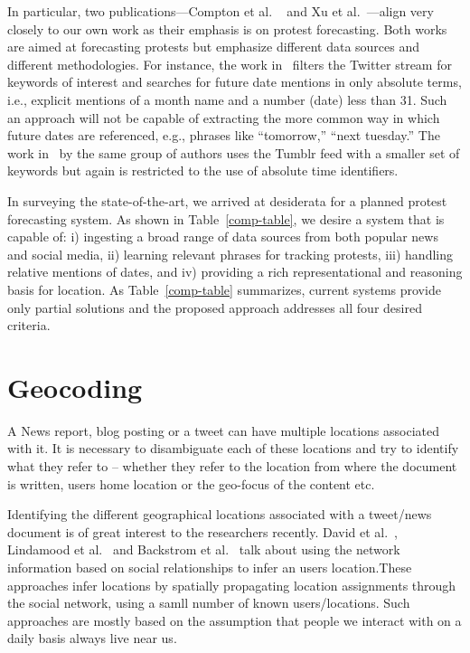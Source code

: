 In particular, two publications---Compton et al. ~\cite{compton2013detecting} and Xu et al.~\cite{xu2014civil}---align very closely to our own work as their emphasis is on protest forecasting.
Both works are aimed at forecasting protests
but emphasize different data sources and different methodologies. For instance, the work in~\cite{compton2013detecting} filters the Twitter stream for
keywords of interest and searches for future date mentions in only absolute terms, i.e., explicit mentions of a month name and a number (date)
less than 31. 
Such an approach will not be capable of extracting the more
common way in which future dates are referenced, e.g., phrases like
``tomorrow,'' ``next tuesday.'' 
The work in~\cite{xu2014civil} by the same group of authors uses the Tumblr feed with a smaller set of keywords but
again is restricted to the use of absolute time identifiers.

In surveying the state-of-the-art, we arrived at desiderata for a planned protest forecasting system. As shown in Table~\ref{comp-table},
we desire a system that is capable of: i) ingesting a broad range of data sources from both popular news and social media,
ii) learning relevant phrases for tracking protests, 
iii) handling relative mentions of dates, and
iv) providing a rich representational and reasoning basis for location. 
As Table~\ref{comp-table} summarizes, current systems provide only partial solutions and the proposed
approach addresses all four desired criteria.

\section{Geocoding}
A News report, blog posting or a tweet can have multiple locations associated with it. It is necessary to disambiguate each of these locations and try to identify what they refer to -- whether they refer to the location from where the document is written, users home location or the geo-focus of the content etc.

Identifying the different geographical locations associated with a tweet/news document is of great interest to the researchers recently.
David et al.~\cite{hrlgeocoder}, Lindamood et al.~\cite{inferringSN} and Backstrom et al.~\cite{findMe} talk about using the network information based on social relationships to infer an users location.These approaches infer locations by spatially propagating location assignments through the social network, using a samll number of known users/locations. Such approaches are mostly based on the assumption that people we interact with on a daily basis always live near us.

